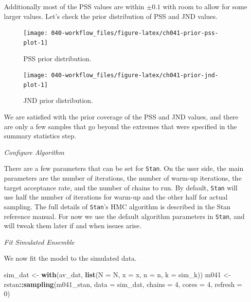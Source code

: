 \documentclass[11pt, oneside, openany]{scrbook}
\newenvironment{Shaded}{\begin{snugshade}}{\end{snugshade}}
\newcommand{\DataTypeTok}[1]{\textcolor[rgb]{0.13,0.29,0.53}{#1}}
\newcommand{\DecValTok}[1]{\textcolor[rgb]{0.00,0.00,0.81}{#1}}
\newcommand{\KeywordTok}[1]{\textcolor[rgb]{0.13,0.29,0.53}{\textbf{#1}}}
\newcommand{\NormalTok}[1]{#1}
\newcommand{\OperatorTok}[1]{\textcolor[rgb]{0.81,0.36,0.00}{\textbf{#1}}}
\newcommand{\StringTok}[1]{\textcolor[rgb]{0.31,0.60,0.02}{#1}}
\begin{document}
Additionally most of the PSS values are within \(\pm 0.1\) with room to allow for some larger values. Let's check the prior distribution of PSS and JND values.

\begin{figure}

{\centering \texttt{[image: 040-workflow\_files/figure-latex/ch041-prior-pss-plot-1]} 

}

\caption{PSS prior distribution.}\label{fig:ch041-prior-pss-plot}
\end{figure}

\begin{figure}

{\centering \texttt{[image: 040-workflow\_files/figure-latex/ch041-prior-jnd-plot-1]} 

}

\caption{JND prior distribution.}\label{fig:ch041-prior-jnd-plot}
\end{figure}

We are satisfied with the prior coverage of the PSS and JND values, and there are only a few samples that go beyond the extremes that were specified in the summary statistics step.

\emph{Configure Algorithm}

There are a few parameters that can be set for \texttt{Stan}. On the user side, the main parameters are the number of iterations, the number of warm-up iterations, the target acceptance rate, and the number of chains to run. By default, \texttt{Stan} will use half the number of iterations for warm-up and the other half for actual sampling. The full details of \texttt{Stan}'s HMC algorithm is described in the Stan reference manual. For now we use the default algorithm parameters in \texttt{Stan}, and will tweak them later if and when issues arise.

\emph{Fit Simulated Ensemble}

We now fit the model to the simulated data.

\begin{Shaded}
\begin{Highlighting}[]
\NormalTok{sim_dat <-}\StringTok{ }\KeywordTok{with}\NormalTok{(av_dat, }\KeywordTok{list}\NormalTok{(}\DataTypeTok{N =}\NormalTok{ N, }\DataTypeTok{x =}\NormalTok{ x, }\DataTypeTok{n =}\NormalTok{ n, }\DataTypeTok{k =}\NormalTok{ sim_k)) }
\NormalTok{m041 <-}\StringTok{ }\NormalTok{rstan}\OperatorTok{::}\KeywordTok{sampling}\NormalTok{(m041_stan, }\DataTypeTok{data =}\NormalTok{ sim_dat, }
                        \DataTypeTok{chains =} \DecValTok{4}\NormalTok{, }\DataTypeTok{cores =} \DecValTok{4}\NormalTok{, }\DataTypeTok{refresh =} \DecValTok{0}\NormalTok{)}
\end{Highlighting}
\end{Shaded}
\end{document}
